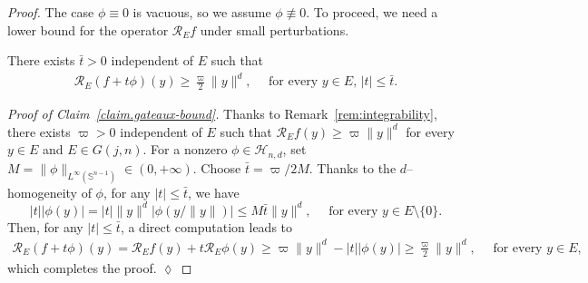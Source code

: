 \documentclass[10pt,a4paper]{amsart}
\newcommand{\Gr}[2]{G(#1,#2)}        %
\newcommand{\cH}{\mathcal{H}}        %
\begin{document}
\begin{proof}
The case $\phi \equiv 0$ is vacuous, so we assume $\phi \not\equiv 0$. 
To proceed, we need a lower bound for the operator $\mathscr{R}_E f$ under small perturbations.

\begin{claim}\label{claim.gateaux-bound}
There exists $\bar t > 0$ independent of $E$ such that
\begin{align*}
	\mathscr R_E (f + t \phi)(y) \geq \frac{\varpi}{2} \| y \|^d, \quad \text{ for every } y \in E, \, |t| \leq \bar t.
\end{align*}
\end{claim}

\textit{Proof of Claim~\ref{claim.gateaux-bound}.}
Thanks to Remark~\ref{rem:integrability}, there exists $\varpi > 0$ independent of $E$ such that $\mathscr R_E f(y) \geq \varpi \| y \|^d$ for every $y \in E$ and $E \in \Gr{j}{n}$.
For a nonzero $\phi \in \cH_{n, d}$, set $M = \textstyle \| \phi \|_{L^\infty(\mathbb S^{n - 1})} \in (0, + \infty)$.
Choose $\bar t = \varpi/2M$.
Thanks to the $d$--homogeneity of $\phi$, for any $|t| \leq \bar t$, we have
\[
	|t| |\phi(y)| = |t| \| y \|^d |\phi(y / \| y \|)| \leq M \bar t \| y \|^d, \quad \text{ for every } y \in E \setminus \{ 0 \}.
\]
Then, for any $|t| \leq \bar t$, a direct computation leads to
\begin{align*}
	\mathscr R_E (f + t \phi)(y) = \mathscr R_E f(y) + t \mathscr R_E \phi(y) \geq \varpi \| y \|^d - |t| |\phi(y)| \geq \frac{\varpi}{2} \| y \|^d, \quad \text{ for every } y \in E,
\end{align*}
which completes the proof. \hfill  $\lozenge$


\end{proof}
\end{document}
